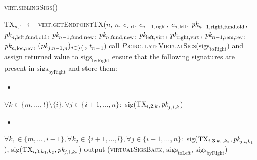 \begin{center}
\begin{processbox}{\textsc{virt.siblingSigs}()}
\begin{algorithmic}[1]
        \State $\mathrm{TX}_{n, 1}$ $\gets$ \textsc{virt.getEndpointTX}($n$,
        $n$, $c_{\mathrm{virt}}$, $c_{n-1, \mathrm{right}}$, $c_{n,
        \mathrm{left}}$, $\textit{pk}_{n-1, \mathrm{right}, \mathrm{fund},
        \mathrm{old}}$, $\textit{pk}_{n, \mathrm{left}, \mathrm{fund}, \mathrm{old}}$,
        $\textit{pk}_{n-1, \mathrm{fund}, \mathrm{new}}$, $\textit{pk}_{n, \mathrm{fund},
        \mathrm{new}}$, $\textit{pk}_{\mathrm{left}, \mathrm{virt}}$,
        $\textit{pk}_{\mathrm{right}, \mathrm{virt}}$, $\textit{pk}_{n-1, \mathrm{rem},
        \mathrm{rev}}$, $\textit{pk}_{n, \mathrm{loc}, \mathrm{rev}}$, $(\textit{pk}_{j, n-1,
        n})_{j \in [n]}$, $t_{n-1}$)
      \EndIf
      \Statex
      \State call
      $\bar{P}$.\textsc{circulateVirtualSigs}($\mathrm{sigs}_{\mathrm{toRight}}$)
      and assign returned value to $\mathrm{sigs}_{\mathrm{byRight}}$
      \State ensure that the following signatures are present in
      $\mathrm{sigs}_{\mathrm{byRight}}$ and store them:
      \begin{itemize}
        \item {}
      \end{itemize}
      \Indent
        \State $\forall k \in \{m, \dots, l\} \setminus \{i\}, \forall j \in
        \{i+1, \dots, n\}:$
        \Indent
          \State sig($\mathrm{TX}_{i, 2, k}, \textit{pk}_{j, i, k}$)
        \EndIndent
      \EndIndent
      \begin{itemize}
        \item {}
      \end{itemize}
      \Indent
        \State $\forall k_1 \in \{m, \dots, i-1\}, \forall k_2 \in \{i+1, \dots,
        l\}, \forall j \in \{i+1, \dots, n\}:$
        \Indent
          \State sig($\mathrm{TX}_{i, 3, k_1, k_2}, \textit{pk}_{j, i, k_1}$),
          sig($\mathrm{TX}_{i, 3, k_1, k_2}, \textit{pk}_{j, i, k_2}$)
        \EndIndent
      \EndIndent
      \State output (\textsc{virtualSigsBack},
      $\mathrm{sigs}_{\mathrm{toLeft}}$, $\mathrm{sigs}_{\mathrm{byRight}}$)
    \end{algorithmic}
  \end{processbox}
  \label{code:virtual-layer:sibling-sigs}
\end{center} \ \\

